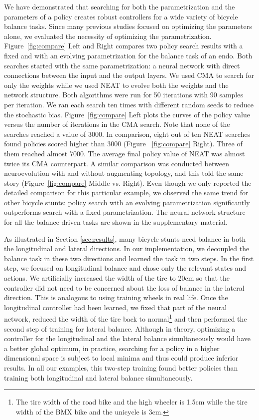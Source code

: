 We have demonstrated that searching for both the parametrization and the parameters of a policy creates robust controllers for a wide variety of bicycle balance tasks. Since many previous studies focused on optimizing the parameters alone, we evaluated the necessity of optimizing the parametrization.
Figure~\ref{fig:compare} Left and Right compares two policy search results with a fixed and with an evolving parametrization for the balance task of an endo. Both searches started with the same parametrization: a neural network with direct connections between the input and the output layers. We used CMA to search for only the weights while we used NEAT to evolve both the weights and the network structure. Both algorithms were run for 50 iterations with 90 samples per iteration. We ran each search ten times with different random seeds to reduce the stochastic bias. Figure~\ref{fig:compare} Left plots the curves of the policy value versus the number of iterations in the CMA search. Note that none of the searches reached a value of 3000. In comparison, eight out of ten NEAT searches found policies scored higher than 3000 (Figure ~\ref{fig:compare} Right). Three of them reached almost 7000. The average final policy value of NEAT was almost twice its CMA counterpart. A similar comparison was conducted between neuroevolution with and without augmenting topology, and this told the same story (Figure~\ref{fig:compare} Middle vs. Right). Even though we only reported the detailed comparison for this particular example, we observed the same trend for other bicycle stunts: policy search with an evolving parametrization significantly outperforms search with a fixed parametrization. The neural network structure for all the balance-driven tasks are shown in the supplementary material.

As illustrated in Section \ref{sec:results}, many bicycle stunts need balance in both the longitudinal and lateral directions. In our implementation, we decoupled the balance task in these two directions and learned the task in two steps. In the first step, we focused on longitudinal balance and chose only the relevant states and actions. We artificially increased the width of the tire to 20cm so that the controller did not need to be concerned about the loss of balance in the lateral direction. This is analogous to using training wheels in real life. Once the longitudinal controller had been learned, we fixed that part of the neural network, reduced the width of the tire back to normal\footnote{The tire width of the road bike and the high wheeler is 1.5cm while the tire width of the BMX bike and the unicycle is 3cm.} and then performed the second step of training for lateral balance. Although in theory, optimizing a controller for the longitudinal and the lateral balance simultaneously would have a better global optimum, in practice, searching for a policy in a higher dimensional space is subject to local minima and thus could produce inferior results. In all our examples, this two-step training found better policies than training both longitudinal and lateral balance simultaneously.

